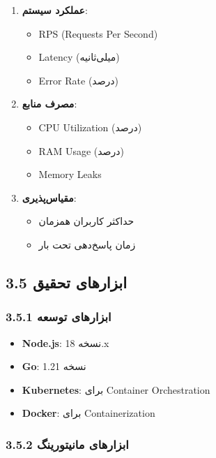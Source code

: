 \documentclass[
]{article}
\providecommand{\tightlist}{%
  \setlength{\itemsep}{0pt}\setlength{\parskip}{0pt}}
\begin{document}
\begin{enumerate}
\def\labelenumi{\arabic{enumi}.}
\item
  \textbf{عملکرد سیستم}:

  \begin{itemize}
  \tightlist
  \item
    RPS (Requests Per Second)
  \item
    Latency (میلی‌ثانیه)
  \item
    Error Rate (درصد)
  \end{itemize}
\item
  \textbf{مصرف منابع}:

  \begin{itemize}
  \tightlist
  \item
    CPU Utilization (درصد)
  \item
    RAM Usage (درصد)
  \item
    Memory Leaks
  \end{itemize}
\item
  \textbf{مقیاس‌پذیری}:

  \begin{itemize}
  \tightlist
  \item
    حداکثر کاربران همزمان
  \item
    زمان پاسخ‌دهی تحت بار
  \end{itemize}
\end{enumerate}

\subsection{3.5 ابزارهای
تحقیق}\label{ux627ux628ux632ux627ux631ux647ux627ux6cc-ux62aux62dux642ux6ccux642}

\subsubsection{3.5.1 ابزارهای
توسعه}\label{ux627ux628ux632ux627ux631ux647ux627ux6cc-ux62aux648ux633ux639ux647}

\begin{itemize}
\tightlist
\item
  \textbf{Node.js}: نسخه 18.x
\item
  \textbf{Go}: نسخه 1.21
\item
  \textbf{Kubernetes}: برای Container Orchestration
\item
  \textbf{Docker}: برای Containerization
\end{itemize}

\subsubsection{3.5.2 ابزارهای
مانیتورینگ}\label{ux627ux628ux632ux627ux631ux647ux627ux6cc-ux645ux627ux646ux6ccux62aux648ux631ux6ccux646ux6af}
\end{document}
